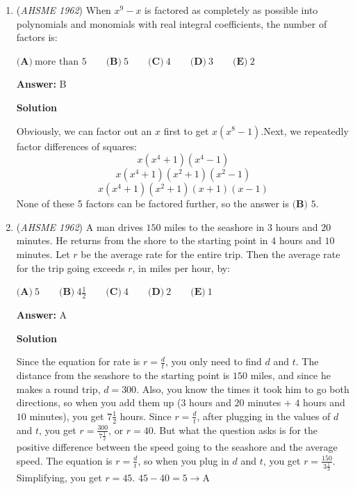 \begin{enumerate}
 $\textbf{(A)}\ 1 \qquad  \textbf{(B)}\ n - \frac{1}{n} \qquad  \textbf{(C)}\ n - \frac{1}{n^2} \qquad  \textbf{(D)}\ 1 - \frac{1}{n^2} \qquad  \textbf{(E)}\ 1 - \frac{1}{n} - \frac{1}{n^2}$

 \textbf{Answer: }D



\textbf{Solution}

Just take $\frac{1(n-1)+(1-\frac{1}{n})}{n}$. You get $\frac{n-1+1-\frac{1}{n}}{n}$, which is just $\frac{n-\frac{1}{n}}{n}$, which is just $\boxed{D}$



	\item (\textit{AHSME 1962}) When $x^9 - x$ is factored as completely as possible into polynomials and monomials with real integral coefficients, the number of factors is:


 $\textbf{(A)}\ \text{more than } 5 \qquad  \textbf{(B)}\ 5 \qquad  \textbf{(C)}\ 4 \qquad  \textbf{(D)}\ 3 \qquad  \textbf{(E)}\ 2$

 \textbf{Answer: }B



\textbf{Solution}

Obviously, we can factor out an $x$ first to get $x(x^8-1)$.Next, we repeatedly factor differences of squares:
 \[x(x^4+1)(x^4-1)\]
 \[x(x^4+1)(x^2+1)(x^2-1)\]
 \[x(x^4+1)(x^2+1)(x+1)(x-1)\]None of these 5 factors can be factored further, so the answer is $\boxed{\textbf{(B) } 5}$.

 


	\item (\textit{AHSME 1962}) A man drives $150$ miles to the seashore in $3$ hours and $20$ minutes. He returns from the shore to the starting point in $4$ hours and $10$ minutes. Let $r$ be the average rate for the entire trip. Then the average rate for the trip going exceeds $r$, in miles per hour, by:


 $\textbf{(A)}\ 5 \qquad  \textbf{(B)}\ 4\frac{1}{2} \qquad  \textbf{(C)}\ 4 \qquad  \textbf{(D)}\ 2 \qquad  \textbf{(E)}\ 1$

 \textbf{Answer: }A



\textbf{Solution}

Since the equation for rate is $r=\frac{d}{t}$, you only need to find $d$ and $t$. The distance from the seashore to the starting point is $150$ miles, and since he makes a round trip, $d=300$. Also, you know the times it took him to go both directions, so when you add them up ($3$ hours and $20$ minutes $+$ $4$ hours and $10$ minutes), you get $7\frac{1}{2}$ hours. Since $r=\frac{d}{t}$, after plugging in the values of $d$ and $t$, you get $r=\frac{300}{7\frac{1}{2}}$, or $r=40$. But what the question asks is for the positive difference between the speed going to the seashore and the average speed. The equation is $r=\frac{d}{t}$, so when you plug in $d$ and $t$, you get $r=\frac{150}{3\frac{1}{3}}$. Simplifying, you get $r=45$. $45-40=5 \rightarrow \boxed{\text{A}}$




\end{enumerate}
